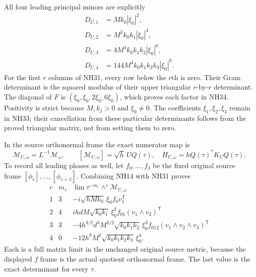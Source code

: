 \documentclass[11pt]{article}
\begin{document}
All four leading principal minors are explicitly
\[
\begin{aligned}
 D_{U,1}&=Mk_0|\xi_0|^2,\\
 D_{U,2}&=M^2k_0k_1|\xi_0|^4,\\
 D_{U,3}&=4M^3k_0k_1k_2|\xi_0|^6,\\
 D_{U,4}&=144M^4k_0k_1k_2k_3|\xi_0|^8.
\end{aligned}\tag{NH34}
\]
For the first $r$ columns of NH31, every row below the
$r$th is zero. Their Gram determinant is the squared
modulus of their upper triangular $r$-by-$r$ determinant.
The diagonal of $F$ is $(\xi_0,\xi_0,2\xi_0,6\xi_0)$,
which proves each factor in NH34. Positivity is strict
because $M,k_j>0$ and $\xi_0\ne0$. The coefficients
$\xi_1,\xi_2,\xi_3$ remain in NH33; their cancellation
from these particular determinants follows from the proved
triangular matrix, not from setting them to zero.

In the source orthonormal frame the exact numerator map is
\[
 \mathcal M_{U,\omega}=L^{-1}\mathcal M_\omega,
 \qquad [\mathcal M_{U,\omega}]=\sqrt h\,UQ(\tau),
 \quad H_{U,\omega}=hQ(\tau)^*K_UQ(\tau).
 \tag{NH35}
\]
To record all leading phases as well, let $f_0,\ldots,f_3$
be the fixed original source frame $[\phi_v],\ldots,
[\phi_{v+3}]$. Combining NH14 with NH31 proves
\[
\begin{array}{c|c|c}
 r&m_r&\lim\tau^{-m_r}\wedge^r\mathcal M_{U,\omega}\\\hline
 1&3&-i\sqrt{hMk_0}\,\xi_0 f_0v_1^{\mathsf T}\\
 2&4&ihdM\sqrt{k_0k_1}\,\xi_0^2
                           f_{01}(v_1\wedge v_2)^{\mathsf T}\\
 3&3&-4h^{3/2}d^3M^{3/2}\sqrt{k_0k_1k_2}\,\xi_0^3
                           f_{012}(v_1\wedge v_2\wedge v_3)^{\mathsf T}\\
 4&0&-12h^8M^2\sqrt{k_0k_1k_2k_3}\,\xi_0^4.
\end{array}\tag{NH36}
\]
Each is a full matrix limit in the unchanged original
source metric, because the displayed $f$ frame is the
actual quotient orthonormal frame. The last value is the
exact determinant for every $\tau$.
\end{document}
